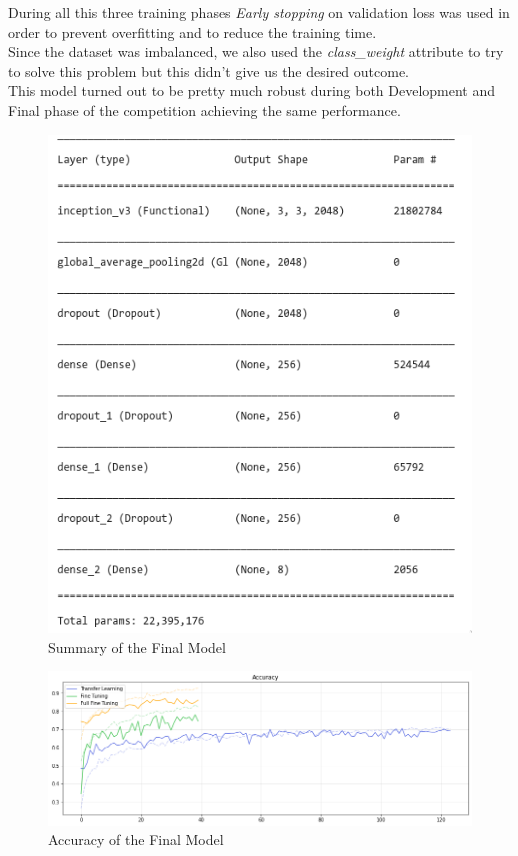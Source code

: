 \documentclass[11pt]{article}
\begin{document}
During all this three training  phases \emph{Early stopping} on validation loss was used in order to prevent overfitting and to reduce the training time.\\
Since the dataset was imbalanced, we also used the \emph{class\_weight} attribute to try to solve this problem but this didn't give us the desired outcome.\\
This model turned out to be pretty much robust during both Development and Final phase of the competition achieving the same performance.

\begin{figure}[H]
	\center
	\includegraphics[scale=0.35]{final_summary.png}
	\caption{Summary of the Final Model}
\end{figure}

\begin{figure}[H]
	\center
	\includegraphics[width=\textwidth]{final_model_accuracy.png}
	\caption{Accuracy of the Final Model}
\end{figure}
\end{document}
